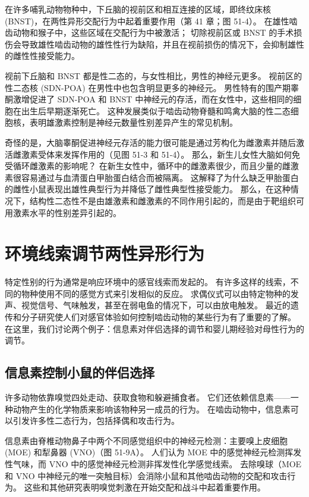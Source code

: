 在许多哺乳动物物种中，下丘脑的视前区和相互连接的区域，即终纹床核 (BNST)，在两性异形交配行为中起着重要作用（第 41 章；图 51-4）。 在雄性啮齿动物和猴子中，这些区域在交配行为中被激活； 切除视前区或 BNST 的手术损伤会导致雄性啮齿动物的雄性性行为缺陷，并且在视前损伤的情况下，会抑制雄性的雌性性接受能力。

视前下丘脑和 BNST 都是性二态的，与女性相比，男性的神经元更多。 视前区的性二态核 (SDN-POA) 在男性中也包含明显更多的神经元。 男性特有的围产期睾酮激增促进了 SDN-POA 和 BNST 中神经元的存活，而在女性中，这些相同的细胞在出生后早期逐渐死亡。 这种发展类似于啮齿动物脊髓和鸣禽大脑的性二态细胞核，表明雄激素控制是神经元数量性别差异产生的常见机制。

奇怪的是，大脑睾酮促进神经元存活的能力很可能是通过芳构化为雌激素并随后激活雌激素受体来发挥作用的（见图 51-3 和 51-4）。 那么，新生儿女性大脑如何免受循环雌激素的影响呢？ 在新生女性中，循环中的雌激素很少，而且少量的雌激素很容易通过与血清蛋白甲胎蛋白结合而被隔离。 这解释了为什么缺乏甲胎蛋白的雌性小鼠表现出雄性典型行为并降低了雌性典型性接受能力。 那么，在这种情况下，结构性二态性不是由雄激素和雌激素的不同作用引起的，而是由于靶组织可用激素水平的性别差异引起的。

\section{环境线索调节两性异形行为}
特定性别的行为通常是响应环境中的感官线索而发起的。 有许多这样的线索，不同的物种使用不同的感觉方式来引发相似的反应。 求偶仪式可以由特定物种的发声、视觉信号、气味触发，甚至在弱电鱼的情况下，可以由放电触发。 最近的遗传和分子研究使人们对感官体验如何控制啮齿动物的某些行为有了重要的了解。 在这里，我们讨论两个例子：信息素对伴侣选择的调节和婴儿期经验对母性行为的调节。

\subsection{信息素控制小鼠的伴侣选择}
许多动物依靠嗅觉四处走动、获取食物和躲避捕食者。 它们还依赖信息素——一种动物产生的化学物质来影响该物种另一成员的行为。 在啮齿动物中，信息素可以引发许多性二态行为，包括择偶和攻击行为。

信息素由脊椎动物鼻子中两个不同感觉组织中的神经元检测：主要嗅上皮细胞 (MOE) 和犁鼻器 (VNO)（图 51-9A）。 人们认为 MOE 中的感觉神经元检测挥发性气味，而 VNO 中的感觉神经元检测非挥发性化学感觉线索。 去除嗅球（MOE 和 VNO 中神经元的唯一突触目标）会消除小鼠和其他啮齿动物的交配和攻击行为。 这些和其他研究表明嗅觉刺激在开始交配和战斗中起着重要作用。

